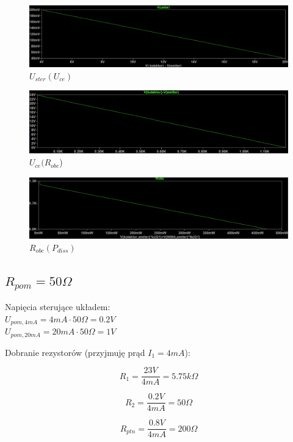 \documentclass{article}
\begin{document}
\begin{figure}[h!]
    \centering
    \includegraphics[scale=0.3]{p1.png}
    \caption{$U_{ster}(U_{ce})$}
\end{figure}


\begin{figure}[h!]
    \centering
    \includegraphics[scale=0.3]{p2.png}
    \caption{$U_{ce}(R_{obc}$)}
\end{figure}


\begin{figure}[h!]
    \centering
    \includegraphics[scale=0.3]{p3.png}
    \caption{$R_{obc}(P_{diss})$}
\end{figure}

\subsection{$R_{pom}=50\Omega$}

Napięcia sterujące układem:\\
$U_{pom, 4mA}=4mA\cdot 50\Omega=0.2V$\\
$U_{pom, 20mA}=20mA\cdot 50\Omega=1V$


Dobranie rezystorów (przyjmuję prąd $I_{1}=4mA$):

$$
    R_{1}=\frac{23V}{4mA}=5.75k\Omega
$$

$$
    R_{2}=\frac{0.2V}{4mA}=50\Omega
$$

$$
    R_{ptn}=\frac{0.8V}{4mA}=200\Omega
$$
\end{document}
